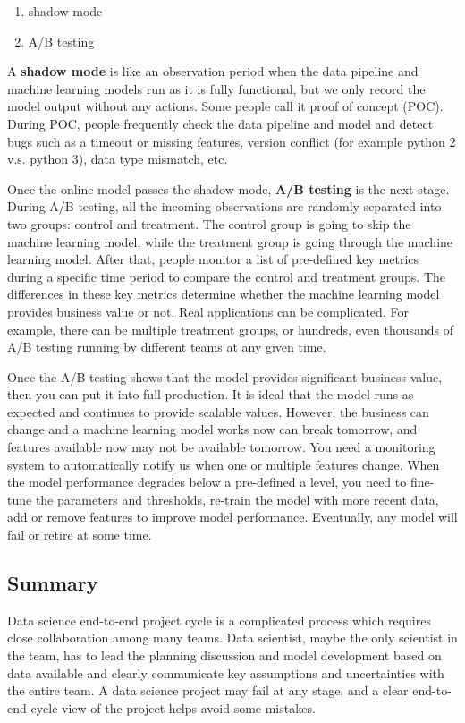 \documentclass[12pt,]{krantz}
\providecommand{\tightlist}{%
  \setlength{\itemsep}{0pt}\setlength{\parskip}{0pt}}
\theoremstyle{definition}
\theoremstyle{definition}
\theoremstyle{definition}
\theoremstyle{remark}
\begin{document}
\begin{enumerate}
\def\labelenumi{\arabic{enumi}.}
\tightlist
\item
  shadow mode
\item
  A/B testing
\end{enumerate}

A \textbf{shadow mode} is like an observation period when the data
pipeline and machine learning models run as it is fully functional, but
we only record the model output without any actions. Some people call it
proof of concept (POC). During POC, people frequently check the data
pipeline and model and detect bugs such as a timeout or missing
features, version conflict (for example python 2 v.s. python 3), data
type mismatch, etc.

Once the online model passes the shadow mode, \textbf{A/B testing} is
the next stage. During A/B testing, all the incoming observations are
randomly separated into two groups: control and treatment. The control
group is going to skip the machine learning model, while the treatment
group is going through the machine learning model. After that, people
monitor a list of pre-defined key metrics during a specific time period
to compare the control and treatment groups. The differences in these
key metrics determine whether the machine learning model provides
business value or not. Real applications can be complicated. For
example, there can be multiple treatment groups, or hundreds, even
thousands of A/B testing running by different teams at any given time.

Once the A/B testing shows that the model provides significant business
value, then you can put it into full production. It is ideal that the
model runs as expected and continues to provide scalable values.
However, the business can change and a machine learning model works now
can break tomorrow, and features available now may not be available
tomorrow. You need a monitoring system to automatically notify us when
one or multiple features change. When the model performance degrades
below a pre-defined a level, you need to fine-tune the parameters and
thresholds, re-train the model with more recent data, add or remove
features to improve model performance. Eventually, any model will fail
or retire at some time.

\subsection{Summary}\label{summary}

Data science end-to-end project cycle is a complicated process which
requires close collaboration among many teams. Data scientist, maybe the
only scientist in the team, has to lead the planning discussion and
model development based on data available and clearly communicate key
assumptions and uncertainties with the entire team. A data science
project may fail at any stage, and a clear end-to-end cycle view of the
project helps avoid some mistakes.
\end{document}
